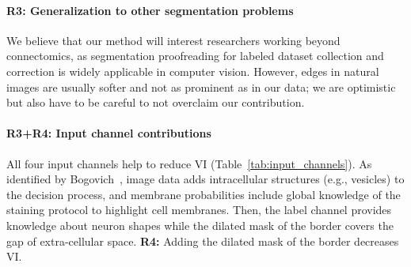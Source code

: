\documentclass[10pt,twocolumn,letterpaper]{article}
\newcommand{\JT}[1]{\textcolor{red}{[JT: #1]}}
\begin{document}
\paragraph{R3: Generalization to other segmentation problems} 
We believe that our method will interest researchers working beyond connectomics, as segmentation proofreading for labeled dataset collection and correction is widely applicable in computer vision. However, edges in natural images are usually softer and not as prominent as in our data; we are optimistic but also have to be careful to not overclaim our contribution.


\paragraph{R3+R4: Input channel contributions} All four input channels help to reduce VI (Table~\ref{tab:input_channels}). As identified by Bogovich~\etal, image data adds intracellular structures (e.g., vesicles) to the decision process, and membrane probabilities include global knowledge of the staining protocol to highlight cell membranes. Then, the label channel provides knowledge about neuron shapes while the dilated mask of the border covers the gap of extra-cellular space. \newline \noindent \textbf{R4:} Adding the dilated mask of the border decreases VI. %
\end{document}
